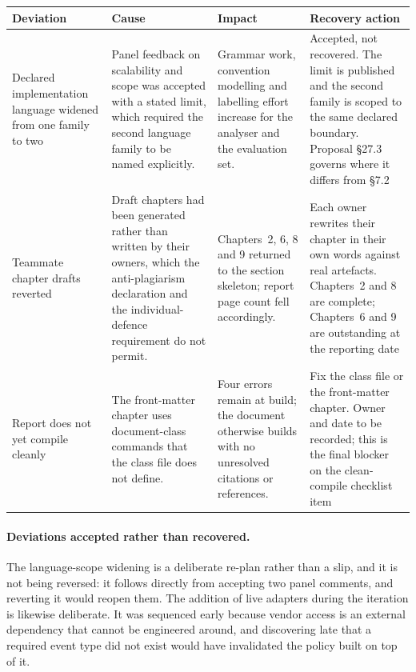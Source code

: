 \begin{longtable}{>{\raggedright\arraybackslash}p{}>{\raggedright\arraybackslash}p{}>{\raggedright\arraybackslash}p{}>{\raggedright\arraybackslash}p{}}
\toprule
Deviation & Cause & Impact & Recovery action \\
\midrule
\endhead
Declared implementation language widened from one family to two
  & Panel feedback on scalability and scope was accepted with a stated limit,
    which required the second language family to be named explicitly.
  & Grammar work, convention modelling and labelling effort increase for the
    analyser and the evaluation set.
  & Accepted, not recovered. The limit is published and the second family is
    scoped to the same declared boundary. Proposal §27.3 governs where it
    differs from §7.2 \\
Teammate chapter drafts reverted
  & Draft chapters had been generated rather than written by their owners,
    which the anti-plagiarism declaration and the individual-defence
    requirement do not permit.
  & Chapters~2, 6, 8 and 9 returned to the section skeleton; report page count
    fell accordingly.
  & Each owner rewrites their chapter in their own words against real
    artefacts. Chapters~2 and 8 are complete; Chapters~6 and 9 are outstanding
    at the reporting date \\
Report does not yet compile cleanly
  & The front-matter chapter uses document-class commands that the class file
    does not define.
  & Four errors remain at build; the document otherwise builds with no
    unresolved citations or references.
  & Fix the class file or the front-matter chapter. Owner and date to be
    recorded; this is the final blocker on the clean-compile checklist item \\
\bottomrule
\end{longtable}

\paragraph{Deviations accepted rather than recovered.} The language-scope
widening is a deliberate re-plan rather than a slip, and it is not being
reversed: it follows directly from accepting two panel comments, and reverting
it would reopen them. The addition of live adapters during the iteration is
likewise deliberate. It was sequenced early because vendor access is an
external dependency that cannot be engineered around, and discovering late that
a required event type did not exist would have invalidated the policy built on
top of it.

